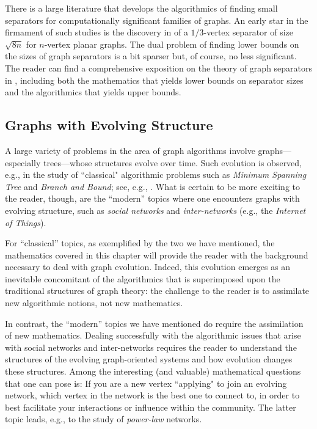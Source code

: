 \medskip

There is a large literature that develops the algorithmics of finding small separators for computationally significant families of graphs.  An early star in the firmament of such studies is the discovery in \cite{LiptonT79} of a $1/3$-vertex separator of size $\sqrt{8n}$ for $n$-vertex planar graphs.  The dual problem of finding lower bounds on the sizes of graph separators is a bit sparser but, of course, no less significant.  The reader can find a comprehensive exposition on the theory of graph separators in \cite{RosenbergH01}, including both the mathematics that
yields lower bounds on separator sizes and the algorithmics that yields upper bounds.


\subsection{Graphs with Evolving Structure}
\label{sec:graph-evolve}

A large variety of problems in the area of graph algorithms involve graphs---especially 
trees---whose structures evolve over time.  Such evolution is observed, e.g., in the study
of ``classical" algorithmic problems such as {\it Minimum Spanning Tree} and 
{\it Branch and Bound}; see, e.g., \cite{CLRS}.  What is certain to be more exciting to the
reader, though, are the ``modern'' topics where one encounters graphs with evolving 
structure, such as {\it social networks} and {\it inter-networks} (e.g., the {\it Internet of Things}).

For ``classical'' topics, as exemplified by the two we have mentioned, the mathematics covered in this chapter will provide the reader with the background necessary to deal with graph evolution.  Indeed, this evolution emerges as an inevitable concomitant of the algorithmics that is superimposed upon the traditional structures of graph theory: the challenge to the reader is to assimilate new algorithmic notions, not new mathematics.

In contrast, the ``modern'' topics we have mentioned do require the assimilation of new 
mathematics.  Dealing successfully with the algorithmic issues that arise with social 
networks and inter-networks requires the reader to understand the structures of the
evolving graph-oriented systems and how evolution changes these structures.
Among the interesting (and valuable) mathematical questions that one can pose is: 
If you are a new vertex ``applying" to join an evolving network, which vertex in the network 
is the best one to connect to, in order to best facilitate your interactions or influence within 
the community.  The latter topic leads, e.g., to the study of {\em power-law} networks.

